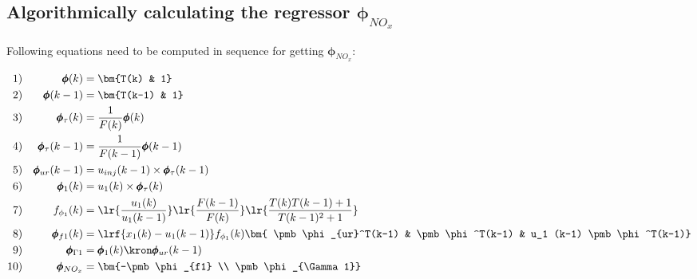 \subsection{Algorithmically calculating the regressor $\pmb \phi_{NO_x}$}

Following equations need to be computed in sequence for getting $\pmb \phi_{NO_x}$:


\begin{align*}
        1)&& \pmb \phi(k) &= \bm{T(k) & 1}\\
        2)&& \pmb \phi(k-1) &= \bm{T(k-1) & 1} \\
        3)&& \pmb \phi_\tau(k) &= \frac{1}{F(k)} \pmb \phi(k)\\
        4)&& \pmb \phi_\tau(k-1)&= \frac{1}{F(k-1)} \pmb \phi(k-1)\\
        5)&& \pmb \phi_{ur}(k-1)&= u_{inj}(k-1) \times \pmb \phi_\tau (k-1) \\
        6)&& \pmb \phi_1(k) &= u_1(k) \times \pmb \phi_\tau(k)\\
        7)&& f_{\phi_1}(k) &= \lr{\frac{u_1(k)}{u_1(k-1)}}
                                \lr{\frac{F(k-1)}{F(k)}}
                                        \lr{\frac{T(k)T(k-1) + 1}{T(k-1)^2 + 1}}\\
        8)&& \pmb \phi_{f1}(k) &= \lrf{{x_1(k) - u_1(k-1)}} f_{\phi_1}(k)
                                \bm{ \pmb \phi_{ur}^T(k-1) &
                                    \pmb \phi^T(k-1)  &
                                    u_1 (k-1) \pmb \phi^T(k-1)}   \\
        9)&& \pmb \phi_{\Gamma 1} &= \pmb \phi_1 (k) \kron \pmb \phi_{ur} (k-1) \\
        10)&& \pmb \phi_{NO_x} &= \bm{-\pmb \phi_{f1} \\ \pmb \phi_{\Gamma 1}}
\end{align*}
